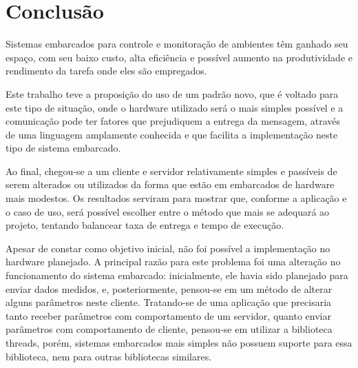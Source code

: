 \chapter{Conclusão}

Sistemas embarcados para controle e monitoração de ambientes têm ganhado seu espaço, com seu baixo custo, alta eficiência e possível aumento na produtividade e rendimento da tarefa onde eles são empregados.

Este trabalho teve a proposição do uso de um padrão novo, que é voltado para este tipo de situação, onde o hardware utilizado será o mais simples possível e a comunicação pode ter fatores que prejudiquem a entrega da mensagem, através de uma linguagem amplamente conhecida e que facilita a implementação neste tipo de sistema embarcado.

Ao final, chegou-se a um cliente e servidor relativamente simples e passíveis de serem alterados ou utilizados da forma que estão em embarcados de hardware mais modestos. Os resultados serviram para mostrar que, conforme a aplicação e o caso de uso, será possível escolher entre o método que mais se adequará ao projeto, tentando balancear taxa de entrega e tempo de execução.

Apesar de constar como objetivo inicial, não foi possível a implementação no hardware planejado. A principal razão para este problema foi uma alteração no funcionamento do sistema embarcado: inicialmente, ele havia sido planejado para enviar dados medidos, e, posteriormente, pensou-se em um método de alterar alguns parâmetros neste cliente. Tratando-se de uma aplicação que precisaria tanto receber parâmetros com comportamento de um servidor, quanto enviar parâmetros com comportamento de cliente, pensou-se em utilizar a biblioteca threads, porém, sistemas embarcados mais simples não possuem suporte para essa biblioteca, nem para outras bibliotecas similares.
